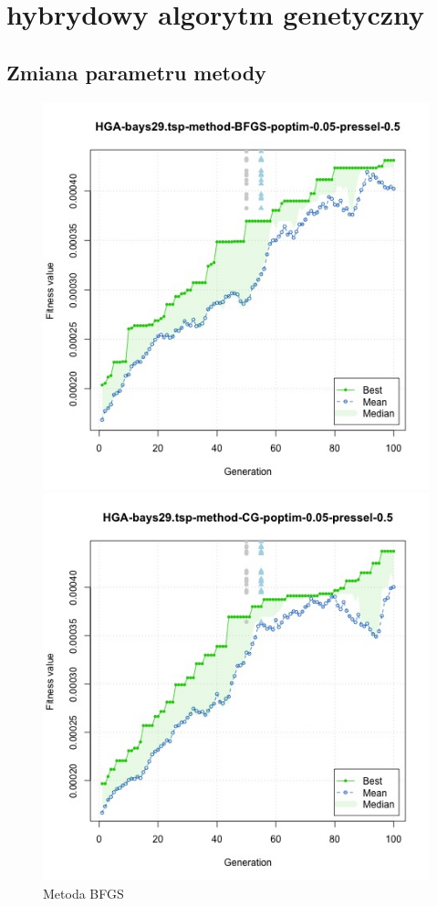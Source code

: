 \documentclass{article}
\begin{document}
    \section{hybrydowy algorytm genetyczny}
    	
    \subsection{Zmiana parametru metody}
    


\begin{figure}[!htb]
  \includegraphics[width=\linewidth]{inc/results/zad3/HGA-bays29-tsp-method-BFGS-poptim-0-05-pressel-0-5}
  \caption{Metoda BFGS}\label{fig:BFGS}
\endminipage\hfill
{}
  \includegraphics[width=\linewidth]{inc/results/zad3/HGA-bays29-tsp-method-CG-poptim-0-05-pressel-0-5}

\end{figure}
\end{document}
